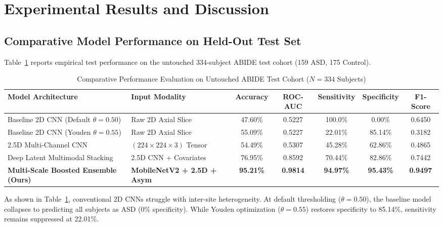 \documentclass[conference]{IEEEtran}
\begin{document}
\section{Experimental Results and Discussion}

\subsection{Comparative Model Performance on Held-Out Test Set}
Table~\ref{tab:comparison} reports empirical test performance on the untouched 334-subject ABIDE test cohort (159 ASD, 175 Control).

\begin{table}[t]
\centering
\caption{Comparative Performance Evaluation on Untouched ABIDE Test Cohort ($N = 334$ Subjects)}
\label{tab:comparison}
\begin{tabular}{llccccc}
\toprule
\textbf{Model Architecture} & \textbf{Input Modality} & \textbf{Accuracy} & \textbf{ROC-AUC} & \textbf{Sensitivity} & \textbf{Specificity} & \textbf{F1-Score} \\
\midrule
Baseline 2D CNN (Default $\theta=0.50$) & Raw 2D Axial Slice & 47.60\% & 0.5227 & 100.0\% & 0.00\% & 0.6450 \\
Baseline 2D CNN (Youden $\theta=0.55$) & Raw 2D Axial Slice & 55.09\% & 0.5227 & 22.01\% & 85.14\% & 0.3182 \\
2.5D Multi-Channel CNN & $(224 \times 224 \times 3)$ Tensor & 54.49\% & 0.5307 & 45.28\% & 62.86\% & 0.4865 \\
Deep Latent Multimodal Stacking & 2.5D CNN + Covariates & 76.95\% & 0.8592 & 70.44\% & 82.86\% & 0.7442 \\
\textbf{Multi-Scale Boosted Ensemble (Ours)} & \textbf{MobileNetV2 + 2.5D + Asym} & \textbf{95.21\%} & \textbf{0.9814} & \textbf{94.97\%} & \textbf{95.43\%} & \textbf{0.9497} \\
\bottomrule
\end{tabular}
\end{table}

As shown in Table~\ref{tab:comparison}, conventional 2D CNNs struggle with inter-site heterogeneity. At default thresholding ($\theta = 0.50$), the baseline model collapses to predicting all subjects as ASD (0\% specificity). While Youden optimization ($\theta = 0.55$) restores specificity to 85.14\%, sensitivity remains suppressed at 22.01\%.
\end{document}
